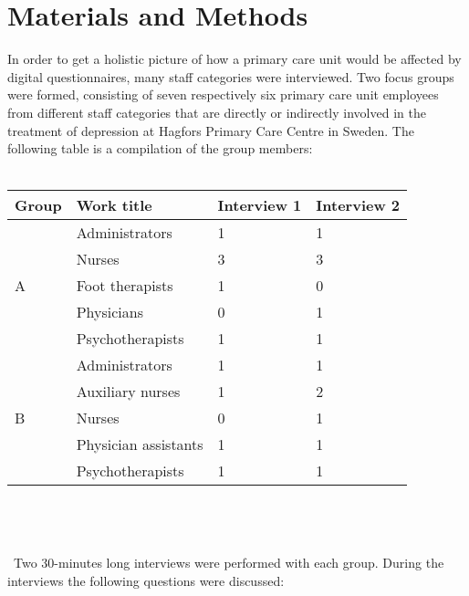 \documentclass[12pt,a4paper,oneside]{article}
\let\oldcite\cite
\renewcommand*\cite[1]{\textsuperscript{\oldcite{#1}}}
\begin{document}
\section*{Materials and Methods}
In order to get a holistic picture of how a primary care unit would be affected by digital questionnaires, many staff categories were interviewed\cite{goal1}. 
Two focus groups were formed, consisting of seven respectively six primary care unit employees from different staff categories that are directly or indirectly involved in the treatment of depression at Hagfors Primary Care Centre in Sweden. The following table is a compilation of the group members:\\\\
\begin{tabular}{p{3em}|p{10em}|l|l}
Group & Work title & Interview 1 & Interview 2 \\
\hline
\multirow{ 5}{*}{A} & Administrators & 1 & 1 \\
& Nurses & 3 & 3 \\
& Foot therapists & 1 & 0\\
& Physicians & 0 & 1\\
& Psychotherapists & 1 & 1\\
\hline
\multirow{ 6}{*}{B} & Administrators & 1 & 1 \\
& Auxiliary nurses & 1 & 2 \\
& Nurses & 0 & 1 \\
& Physician assistants & 1 & 1\\
& Psychotherapists & 1 & 1\\
\hline
\end{tabular}\\ \\\ \\\ 
Two 30-minutes long interviews were performed with each group. During the interviews the following questions were discussed:\\\ \\
\end{document}
